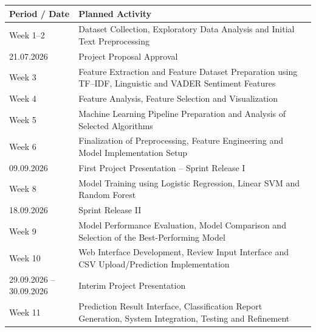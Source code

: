 \documentclass[12pt,a4paper]{report}
\begin{document}
\begin{table}[H]
\centering
\renewcommand{\arraystretch}{1.5}
\setlength{\tabcolsep}{8pt}

\begin{tabularx}{\textwidth}{|>{\raggedright\arraybackslash}p{3.5cm}|X|}
\hline
\textbf{Period / Date} & \textbf{Planned Activity} \\
\hline

Week 1--2 &
Dataset Collection, Exploratory Data Analysis and Initial Text Preprocessing \\
\hline

21.07.2026 &
Project Proposal Approval \\
\hline

Week 3 &
Feature Extraction and Feature Dataset Preparation using TF--IDF, Linguistic and VADER Sentiment Features \\
\hline

Week 4 &
Feature Analysis, Feature Selection and Visualization \\
\hline

Week 5 &
Machine Learning Pipeline Preparation and Analysis of Selected Algorithms \\
\hline

Week 6 &
Finalization of Preprocessing, Feature Engineering and Model Implementation Setup \\
\hline

09.09.2026 &
First Project Presentation -- Sprint Release I \\
\hline

Week 8 &
Model Training using Logistic Regression, Linear SVM and Random Forest \\
\hline

18.09.2026 &
Sprint Release II \\
\hline

Week 9 &
Model Performance Evaluation, Model Comparison and Selection of the Best-Performing Model \\
\hline

Week 10 &
Web Interface Development, Review Input Interface and CSV Upload/Prediction Implementation \\
\hline

29.09.2026 -- 30.09.2026 &
Interim Project Presentation \\
\hline

Week 11 &
Prediction Result Interface, Classification Report Generation, System Integration, Testing and Refinement \\
\hline


\end{tabularx}
\end{table}
\end{document}
